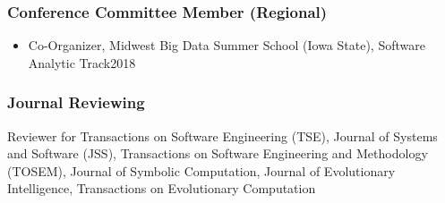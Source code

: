\documentclass[11pt]{article}
\begin{document}
\subsubsection{Conference Committee Member (Regional)}

\begin{itemize}
    \item Co-Organizer, Midwest Big Data Summer School (Iowa State), Software Analytic Track\hfill 2018
\end{itemize}


\subsubsection{Journal Reviewing}
\begin{description}
    \item Reviewer for  Transactions on Software Engineering (TSE), Journal of Systems and Software (JSS), Transactions on Software Engineering and Methodology (TOSEM), Journal of Symbolic Computation, Journal of Evolutionary Intelligence, Transactions on Evolutionary Computation
\end{description}
\end{document}
